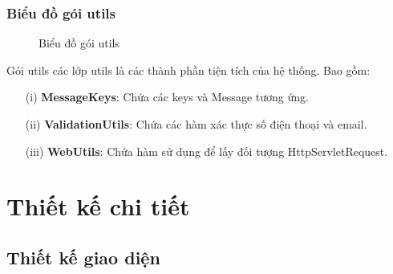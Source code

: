 \documentclass[../DoAn.tex]{subfiles}
\begin{document}
\subsubsection{Biểu đồ gói utils}

\begin{figure}[H]
    \centering
    \caption{Biểu đồ gói utils}
    \label{fig:Fig8}
\end{figure}
Gói utils các lớp utils là các thành phần tiện tích của hệ thống. Bao gồm:
\begin{enumerate}
    \item [(i)] \textbf{MessageKeys}: Chứa các keys và Message tương ứng.
    \item [(ii)]\textbf{ValidationUtils}: Chứa các hàm xác thực số điện thoại và email.
    \item[(iii)] \textbf{WebUtils}: Chứa hàm sử dụng để lấy đối tượng HttpServletRequest.
\end{enumerate}
\section{Thiết kế chi tiết}
\subsection{Thiết kế giao diện}
\end{document}
